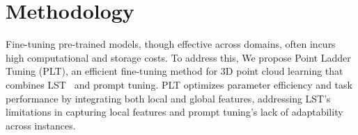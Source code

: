 




\section{Methodology}
\label{sec:methodology}

Fine-tuning pre-trained models, though effective across domains, often incurs high computational and storage costs. To address this, We propose Point Ladder Tuning (PLT), an efficient fine-tuning method for 3D point cloud learning that combines LST~\cite{sung2022lst} and prompt tuning\cite{jia2022visual}. PLT optimizes parameter efficiency and task performance by integrating both local and global features, addressing LST’s limitations in capturing local features and prompt tuning’s lack of adaptability across instances.


